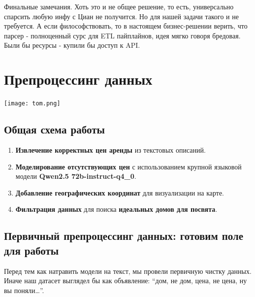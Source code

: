 \documentclass{article}
\begin{document}
Финальные замечания. Хоть это и не общее решение, то есть, универсально спарсить любую инфу с Циан не получится. Но для нашей задачи такого и не требуется. А если философствовать, то в настоящем бизнес-решении верить, что парсер - полноценный сурс для ETL пайплайнов, идея мягко говоря бредовая. Были бы ресурсы - купили бы доступ к API.




\newpage

\section{Препроцессинг данных}

\texttt{[image: tom.png]}

\subsection*{Общая схема работы}
\begin{enumerate}
    \item \textbf{Извлечение корректных цен аренды} из текстовых описаний.
    \item \textbf{Моделирование отсутствующих цен} с использованием крупной языковой модели \textbf{Qwen2.5 72b-instruct-q4\_0}.
    \item \textbf{Добавление географических координат} для визуализации на карте.
    \item \textbf{Фильтрация данных} для поиска \textbf{идеальных домов для посвята}.
\end{enumerate}

\subsection{Первичный препроцессинг данных: готовим поле для работы}

Перед тем как натравить модели на текст, мы провели первичную чистку данных. Иначе наш датасет выглядел бы как объявление: “дом, не дом, цена, не цена, ну вы поняли…”.
\end{document}
